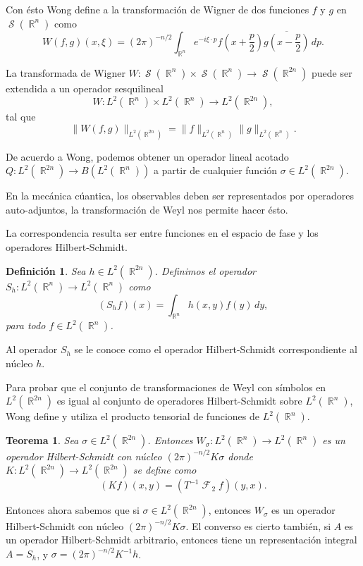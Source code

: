 \documentclass[a4paper]{report}
\DeclareMathOperator{\R}{\mathbb{R}}
\DeclareMathOperator{\Sz}{\mathcal S}
\DeclareMathOperator{\F}{\mathcal{F}\!}
\newtheorem{definition}{Definición}
\newtheorem{theorem}{Teorema}
\begin{document}
  Con ésto Wong define a la transformación de Wigner de dos
  funciones $f$ y $g$ en $\Sz(\R^{n})$ como
  \begin{equation}
    W(f,g)(x,\xi)
    = (2\pi)^{-n / 2} \int_{\R^{n}} e^{-i\xi \cdot p}
    f\left( x + \frac{p}{2} \right) \overline{g\left( x -
    \frac{p}{2} \right) } \, dp.
  \end{equation}

  La transformada de Wigner $W : \Sz(\R^{n}) \times
  \Sz(\R^{n}) \to \Sz(\R^{2n})$ puede ser extendida a un
  operador sesquilineal
  \[
    W : L^2(\R^{n}) \times L^2(\R^{n}) \to L^2(\R^{2n}),
  \] 
  tal que
  \[
    \|W(f,g)\|_{L^2(\R^{2n})}
    = \|f\|_{L^2(\R^{n})} \|g\|_{L^2(\R^{n})}.
  \] 

  De acuerdo a Wong, podemos obtener un operador lineal
  acotado $Q : L^2(\R^{2n}) \to B(L^2(\R^{n}))$ a partir de
  cualquier función $\sigma \in L^2(\R^{2n})$.

  En la mecánica cúantica, los observables deben ser
  representados por operadores auto-adjuntos, la
  transformación de Weyl nos permite hacer ésto.

  La correspondencia resulta ser entre funciones en el
  espacio de fase y los operadores Hilbert-Schmidt.

  \begin{definition}
    Sea $h \in L^2(\R^{2n})$. Definimos el operador $S_h :
    L^2(\R^{n}) \to L^2(\R^{n})$ como
    \begin{equation}
      (S_hf)(x)
      = \int_{\R^{n}} h(x,y) f(y) \, dy,
    \end{equation}
    para todo $f \in L^2(\R^{n})$.
  \end{definition}
  Al operador $S_h$ se le conoce como el operador
  Hilbert-Schmidt correspondiente al núcleo $h$.

  Para probar que el conjunto de transformaciones de Weyl
  con símbolos en $L^2(\R^{2n})$ es igual al conjunto de
  operadores Hilbert-Schmidt sobre $L^2(\R^{n})$, Wong
  define y utiliza el producto tensorial de funciones de
  $L^2(\R^{n})$.

  \begin{theorem}
    Sea $\sigma \in L^2(\R^{2n})$. Entonces $W_\sigma :
    L^2(\R^{n}) \to L^2(\R^{n})$ es un operador
    Hilbert-Schmidt con núcleo $(2\pi)^{-n / 2}K \sigma$
    donde $K : L^2(\R^{2n}) \to L^2(\R^{2n})$ se define como
    \[
      (Kf)(x,y)
      = (T^{-1}\F_2 f)(y,x).
    \] 
  \end{theorem}

  Entonces ahora sabemos que si $\sigma \in L^2(\R^{2n})$,
  entonces $W_\sigma$ es un operador Hilbert-Schmidt con
  núcleo $(2\pi)^{-n / 2} K \sigma$. El converso es cierto
  también, si $A$ es un operador Hilbert-Schmidt arbitrario,
  entonces tiene un representación integral $A = S_h$, y
  $\sigma = (2\pi)^{-n / 2} K^{-1}h$.
\end{document}
